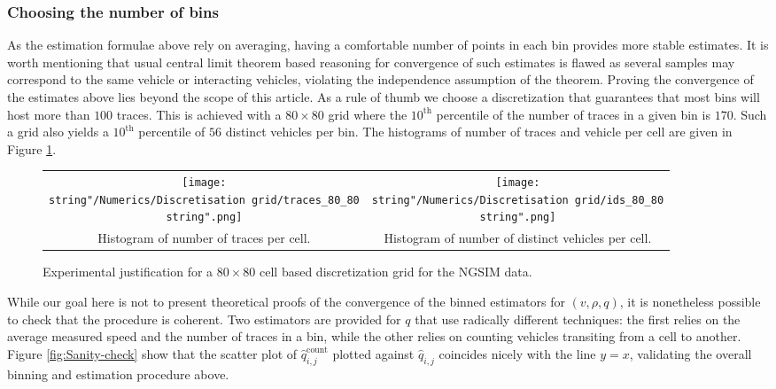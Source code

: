 \documentclass[preprint]{elsarticle}
\DeclareMathOperator{\cnt}{count}
\begin{document}
\subsubsection{Choosing the number of bins}

As the estimation formulae above rely on averaging, having a comfortable
number of points in each bin provides more stable estimates. It is worth mentioning that usual central limit theorem based reasoning for convergence of such estimates is flawed as several samples may correspond to the same vehicle or interacting vehicles, violating the independence assumption of the theorem. Proving the convergence of the estimates above lies beyond the scope of this article. As a rule of thumb we choose a discretization that guarantees that most bins will host more than $100$ traces. This is achieved with a $80\times80$ grid where the $10^{\text{th}}$ percentile of the number of traces in a given bin is $170$. Such a grid also yields a $10^{\text{th}}$ percentile of $56$ distinct vehicles per bin. The histograms of number of traces and vehicle per cell are given in Figure \ref{fig:Grid control}.

\begin{figure}[H]
\centering
\begin{tabular}{cc}
\texttt{[image: \\string"/Numerics/Discretisation grid/traces\_80\_80\\string".png]} & \texttt{[image: \\string"/Numerics/Discretisation grid/ids\_80\_80\\string".png]}\tabularnewline
Histogram of number of traces per cell. & Histogram of number of distinct vehicles per cell. \tabularnewline
\end{tabular}
\caption{Experimental justification for a $80\times 80$ cell based discretization
grid for the NGSIM data.}
\label{fig:Grid control}
\end{figure}

While our goal here is not to present theoretical proofs of the convergence of the binned estimators for $\left(v,\rho,q\right)$, it is nonetheless possible to check that the procedure is coherent. Two estimators are provided for $q$ that use radically
different techniques: the first relies on the average measured speed and the number of traces in a bin, while the other relies on counting vehicles transiting from a cell to another. Figure \ref{fig:Sanity-check} show that the scatter plot of $\widehat{q}_{i,j}^{\cnt}$ plotted against $\widehat{q}_{i,j}$ coincides nicely with the line $y=x$, validating the overall binning and estimation procedure above.
\end{document}

